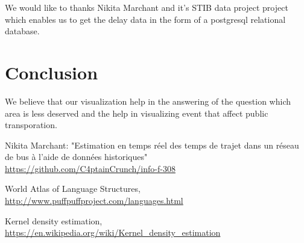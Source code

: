 \documentclass[11pt]{article}%
\begin{document}
We would like to thanks Nikita Marchant and it's STIB data project \cite{nikita} project which enables us to get the delay data in the form of a postgresql relational database.

\section{Conclusion}
We believe that our visualization help in the answering of the question which area is less deserved and the help in visualizing event that affect public transporation. 

 
\begin{thebibliography}{9}
 
Nikita Marchant: "Estimation en temps réel des temps de trajet dans un réseau de bus à l'aide de données historiques"
\\\url{https://github.com/C4ptainCrunch/info-f-308}

World Atlas of Language Structures,
\\\url{http://www.puffpuffproject.com/languages.html}

Kernel density estimation,
\\\url{https://en.wikipedia.org/wiki/Kernel_density_estimation}



\end{thebibliography}
\end{document}
